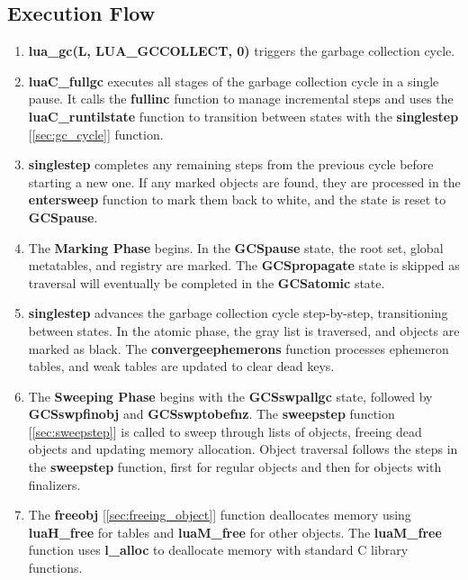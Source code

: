 \documentclass[10pt]{article}
\begin{document}
\subsection{Execution Flow}

\begin{enumerate}
    \item \textbf{lua\_gc(L, LUA\_GCCOLLECT, 0)} triggers the garbage collection cycle.
    
    \item \textbf{luaC\_fullgc} executes all stages of the garbage collection cycle in a single pause. It calls the \textbf{fullinc} function to manage incremental steps and uses the \textbf{luaC\_runtilstate} function to transition between states with the \textbf{singlestep} [\ref{sec:gc_cycle}] function.
  
    \item \textbf{singlestep} completes any remaining steps from the previous cycle before starting a new one. If any marked objects are found, they are processed in the \textbf{entersweep} function to mark them back to white, and the state is reset to \textbf{GCSpause}.
  
    \item The \textbf{Marking Phase} begins. In the \textbf{GCSpause} state, the root set, global metatables, and registry are marked. The \textbf{GCSpropagate} state is skipped as traversal will eventually be completed in the \textbf{GCSatomic} state.
  
    \item \textbf{singlestep} advances the garbage collection cycle step-by-step, transitioning between states. In the atomic phase, the gray list is traversed, and objects are marked as black. The \textbf{convergeephemerons} function processes ephemeron tables, and weak tables are updated to clear dead keys.

    \item The \textbf{Sweeping Phase} begins with the \textbf{GCSswpallgc} state, followed by \textbf{GCSswpfinobj} and \textbf{GCSswptobefnz}. The \textbf{sweepstep} function [\ref{sec:sweepstep}] is called to sweep through lists of objects, freeing dead objects and updating memory allocation.  Object traversal follows the steps in the \textbf{sweepstep} function, first for regular objects and then for objects with finalizers.

    \item The \textbf{freeobj} [\ref{sec:freeing_object}] function deallocates memory using \textbf{luaH\_free} for tables and \textbf{luaM\_free} for other objects. The \textbf{luaM\_free} function uses \textbf{l\_alloc} to deallocate memory with standard C library functions.
  \end{enumerate}
\end{document}
